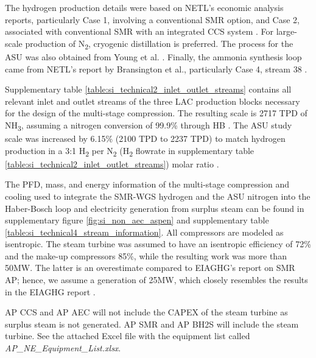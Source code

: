 \documentclass{article}
\begin{document}
The hydrogen production details were based on NETL's economic analysis reports, particularly Case 1, involving a conventional SMR option, and Case 2, associated with conventional SMR with an integrated CCS system \cite{LEWIS2022}. For large-scale production of N\textsubscript{2}, cryogenic distillation is preferred. The process for the ASU was also obtained from Young et al. \cite{Young2021}. Finally, the ammonia synthesis loop came from NETL's report by Bransington et al., particularly Case 4, stream 38 \cite{Brasington2011}.

Supplementary table \ref{table:si_technical2_inlet_outlet_streams} contains all relevant inlet and outlet streams of the three LAC production blocks necessary for the design of the multi-stage compression. The resulting scale is 2717 TPD of NH\textsubscript{3}, assuming a nitrogen conversion of 99.9\% through HB \cite{Brasington2011}. The ASU study scale was increased by 6.15\% (2100 TPD to 2237 TPD) to match hydrogen production in a 3:1 H\textsubscript{2} per N\textsubscript{2} (H\textsubscript{2} flowrate in supplementary table \ref{table:si_technical2_inlet_outlet_streams}) molar ratio \cite{LEWIS2022, Young2021}.

The PFD, mass, and energy information of the multi-stage compression and cooling used to integrate the SMR-WGS hydrogen and the ASU nitrogen into the Haber-Bosch loop and electricity generation from surplus steam can be found in supplementary figure \ref{fig:si_non_aec_aspen} and supplementary table \ref{table:si_technical4_stream_information}. All compressors are modeled as isentropic. The steam turbine was assumed to have an isentropic efficiency of 72\% and the make-up compressors 85\%, while the resulting work was more than 50MW. The latter is an overestimate compared to EIAGHG’s report on SMR AP; hence, we assume a generation of 25MW, which closely resembles the results in the EIAGHG report \cite{IEAGHG2017}.

AP CCS and AP AEC will not include the CAPEX of the steam turbine as surplus steam is not generated. AP SMR and AP BH2S will include the steam turbine. See the attached Excel file with the equipment list called \textit{AP\_NE\_Equipment\_List.xlsx}.
\end{document}
